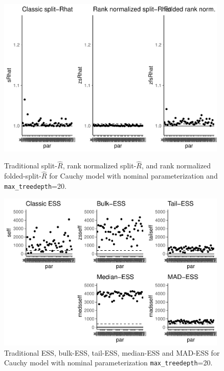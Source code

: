 \documentclass[american,]{article}
\theoremstyle{definition}
\begin{document}
\begin{figure}[tp]
  \centering
  \begin{minipage}{0.48\textwidth}
  \includegraphics[width=0.98\textwidth]{graphics/rhat-fit-nom-td20-1.pdf}
  \caption{Traditional split-\(\widehat{R}\), rank normalized
    split-\(\widehat{R}\), and rank normalized
    folded-split-\(\widehat{R}\) for Cauchy model with nominal
    parameterization and \texttt{max\_treedepth}=20.}
  \label{fig:rhat-fit-nom-td20-1}
\end{minipage}
\hfill
  \begin{minipage}{0.48\textwidth}
  \includegraphics[width=0.98\textwidth]{graphics/ess-fit-nom-td20-1.pdf}
  \caption{Traditional ESS, bulk-ESS, tail-ESS, median-ESS and MAD-ESS for
    Cauchy model with nominal parameterization \texttt{max\_treedepth}=20.}
  \label{fig:ess-fit-nom-td20-1}
\end{minipage}
\end{figure}
\end{document}
